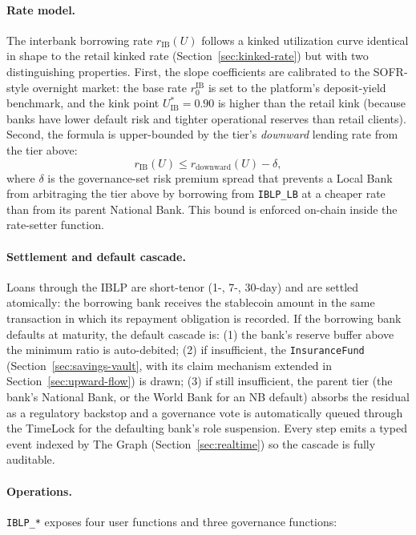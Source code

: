 \documentclass[12pt,a4paper]{report}
\begin{document}
\paragraph{Rate model.}
The interbank borrowing rate $r_{\text{IB}}(U)$ follows a kinked utilization curve identical in shape to the retail kinked rate (Section~\ref{sec:kinked-rate}) but with two distinguishing properties. First, the slope coefficients are calibrated to the SOFR-style overnight market: the base rate $r_0^{\text{IB}}$ is set to the platform's deposit-yield benchmark, and the kink point $U^{*}_{\text{IB}} = 0.90$ is higher than the retail kink (because banks have lower default risk and tighter operational reserves than retail clients). Second, the formula is upper-bounded by the tier's \emph{downward} lending rate from the tier above:
\[
r_{\text{IB}}(U) \le r_{\text{downward}}(U) - \delta,
\]
where $\delta$ is the governance-set risk premium spread that prevents a Local Bank from arbitraging the tier above by borrowing from \texttt{IBLP\_LB} at a cheaper rate than from its parent National Bank. This bound is enforced on-chain inside the rate-setter function.

\paragraph{Settlement and default cascade.}
Loans through the IBLP are short-tenor (1-, 7-, 30-day) and are settled atomically: the borrowing bank receives the stablecoin amount in the same transaction in which its repayment obligation is recorded. If the borrowing bank defaults at maturity, the default cascade is: (1) the bank's reserve buffer above the minimum ratio is auto-debited; (2) if insufficient, the \texttt{InsuranceFund} (Section~\ref{sec:savings-vault}, with its claim mechanism extended in Section~\ref{sec:upward-flow}) is drawn; (3) if still insufficient, the parent tier (the bank's National Bank, or the World Bank for an NB default) absorbs the residual as a regulatory backstop and a governance vote is automatically queued through the TimeLock for the defaulting bank's role suspension. Every step emits a typed event indexed by The Graph (Section~\ref{sec:realtime}) so the cascade is fully auditable.

\paragraph{Operations.}
\texttt{IBLP\_*} exposes four user functions and three governance functions:
\end{document}

